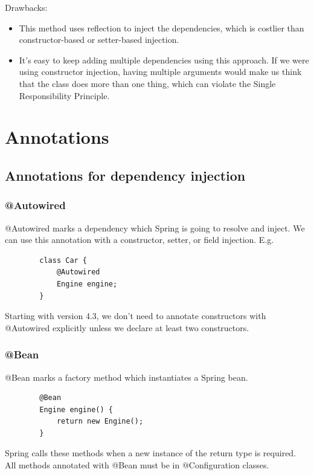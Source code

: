 \documentclass{scrartcl}
\begin{document}
    Drawbacks:
    \begin{itemize}
        \item This method uses reflection to inject the dependencies, which is costlier than constructor-based or setter-based injection.
        \item It’s easy to keep adding multiple dependencies using this approach. If we were using constructor injection, having multiple arguments would make us think that the class does more than one thing, which can violate the Single Responsibility Principle.
    \end{itemize}

\section{Annotations}
\subsection{Annotations for dependency injection}
\subsubsection{@Autowired}
    @Autowired marks a dependency which Spring is going to resolve and inject. We can use this annotation with a constructor, setter, or field injection. E.g.

    \begin{lstlisting}
        class Car {
            @Autowired
            Engine engine;
        }
    \end{lstlisting}

    Starting with version 4.3, we don’t need to annotate constructors with @Autowired explicitly unless we declare at least two constructors.

\subsubsection{@Bean}

    @Bean marks a factory method which instantiates a Spring bean.

    \begin{lstlisting}
        @Bean
        Engine engine() {
            return new Engine();
        }
    \end{lstlisting}

    Spring calls these methods when a new instance of the return type is required. All methods annotated with @Bean must be in @Configuration classes.
\end{document}
